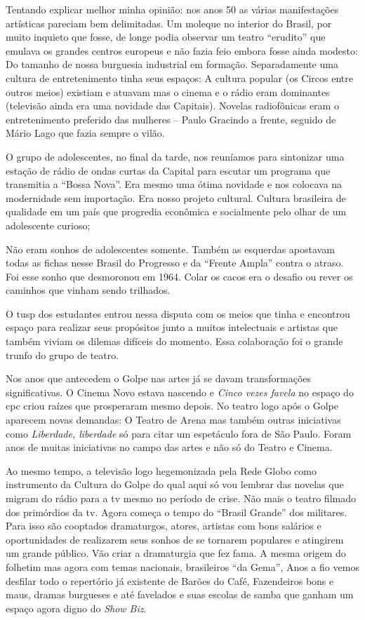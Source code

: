 Tentando explicar melhor minha opinião: nos anos 50 as várias
manifestações artísticas pareciam bem delimitadas. Um moleque no
interior do Brasil, por muito inquieto que fosse, de longe podia
observar um teatro “erudito” que emulava os grandes centros europeus e
não fazia feio embora fosse ainda modesto: Do tamanho de nossa burguesia
industrial em formação. Separadamente uma cultura de entretenimento
tinha seus espaços: A cultura popular (os Circos entre outros meios)
existiam e atuavam mas o cinema e o rádio eram dominantes (televisão
ainda era uma novidade das Capitais). Novelas radiofônicas eram o
entretenimento preferido das mulheres -- Paulo Gracindo a frente,
seguido de Mário Lago que fazia sempre o vilão.

O grupo de adolescentes, no final da tarde, nos reuníamos para
sintonizar uma estação de rádio de ondas curtas da Capital para escutar
um programa que transmitia a “Bossa Nova”. Era mesmo uma ótima novidade
e nos colocava na modernidade sem importação. Era nosso projeto
cultural. Cultura brasileira de qualidade em um país que progredia
econômica e socialmente pelo olhar de um adolescente curioso;

Não eram sonhos de adolescentes somente. Também as esquerdas apostavam
todas as fichas nesse Brasil do Progresso e da “Frente Ampla” contra o
atraso. Foi esse sonho que desmoronou em 1964. Colar os cacos era o
desafio ou rever os caminhos que vinham sendo trilhados.

O {\sc tusp} dos estudantes entrou nessa disputa com os meios que tinha e
encontrou espaço para realizar seus propósitos junto a muitos
intelectuais e artistas que também viviam os dilemas difíceis do
momento. Essa colaboração foi o grande trunfo do grupo de teatro.

Nos anos que antecedem o Golpe nas artes já se davam transformações
significativas. O Cinema Novo estava nascendo e {\it Cinco vezes favela}
no espaço do {\sc cpc} criou raízes que prosperaram mesmo depois. No teatro
logo após o Golpe aparecem novas demandas: O Teatro de Arena mas também
outras iniciativas como {\it Liberdade, liberdade} só para citar um
espetáculo fora de São Paulo. Foram anos de muitas iniciativas no campo
das artes e não só do Teatro e Cinema.

Ao mesmo tempo, a televisão logo hegemonizada pela Rede Globo como
instrumento da Cultura do Golpe do qual aqui só vou lembrar das novelas
que migram do rádio para a {\sc tv} mesmo no período de crise. Não mais o
teatro filmado dos primórdios da {\sc tv}. Agora começa o tempo do “Brasil
Grande” dos militares. Para isso são cooptados dramaturgos, atores,
artistas com bons salários e oportunidades de realizarem seus sonhos de
se tornarem populares e atingirem um grande público. Vão criar a
dramaturgia que fez fama. A mesma origem do folhetim mas agora com temas
nacionais, brasileiros “da Gema”, Anos a fio vemos desfilar todo o
repertório já existente de Barões do Café, Fazendeiros bons e maus,
dramas burgueses e até favelados e suas escolas de samba que ganham um
espaço agora digno do {\it Show Biz}.

